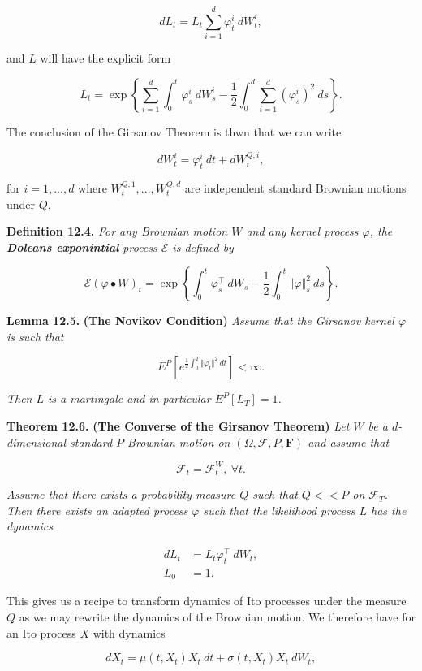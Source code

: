 \documentclass[
]{article}
\begin{document}
\[
dL_t=L_t\sum_{i=1}^d\varphi^i_t\ dW_t^i,
\]

and \(L\) will have the explicit form

\[
L_t=\exp\left\{\sum_{i=1}^d\int_0^t\varphi^i_s\ dW_s^i - \frac{1}{2}\int_0^d\sum_{i=1}^d(\varphi^i_s)^2\ ds\right\}.
\]

The conclusion of the Girsanov Theorem is thwn that we can write

\[
dW_t^i=\varphi_t^i\ dt+dW_t^{Q,i},
\]

for \(i=1,...,d\) where \(W_t^{Q,1},...,W_t^{Q,d}\) are independent
standard Brownian motions under \(Q\).

\textbf{Definition 12.4.} \emph{For any Brownian motion \(W\) and any
kernel process \(\varphi\), the \textbf{Doleans exponintial} process
\(\mathcal{E}\) is defined by}

\[
\mathcal{E}(\varphi\bullet W)_t=\exp\left\{\int_0^t\varphi^\top_s\ dW_s -\frac{1}{2}\int_0^t\Vert \varphi\Vert^2_s\ ds\right\}.\tag{12.24}
\]

\textbf{Lemma 12.5.} \textbf{(The Novikov Condition)} \emph{Assume that
the Girsanov kernel \(\varphi\) is such that}

\[
E^P\left[e^{\frac{1}{2}\int_0^T\Vert \varphi_t\Vert^2\ dt}\right]<\infty.\tag{12.27}
\]

\emph{Then \(L\) is a martingale and in particular \(E^P[L_T]=1\).}

\textbf{Theorem 12.6.} \textbf{(The Converse of the Girsanov Theorem)}
\emph{Let \(W\) be a \(d\)-dimensional standard \(P\)-Brownian motion on
\((\Omega,\mathcal{F},P,\mathbf{F})\) and assume that}

\[
\mathcal{F}_t=\mathcal{F}^W_t,\ \forall t.
\]

\emph{Assume that there exists a probability measure \(Q\) such that
\(Q<<P\) on \(\mathcal{F}_T\). Then there exists an adapted process
\(\varphi\) such that the likelihood process \(L\) has the dynamics}

\begin{align*}
dL_t&=L_t\varphi^\top_t\ dW_t,\\
L_0&=1.
\end{align*}

This gives us a recipe to transform dynamics of Ito processes under the
measure \(Q\) as we may rewrite the dynamics of the Brownian motion. We
therefore have for an Ito process \(X\) with dynamics

\[
dX_t=\mu(t,X_t)X_t\ dt+\sigma(t,X_t) X_t\ dW_t,
\]
\end{document}

